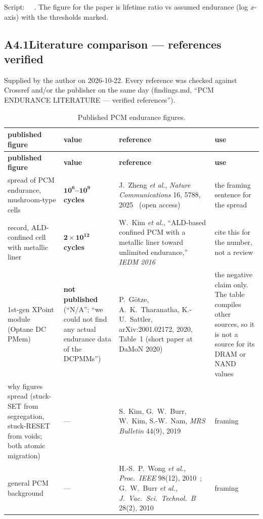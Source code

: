 \documentclass[11pt,a4paper]{article}
\newcommand{\hd}[1]{\textbf{#1}}
\begin{document}
Script: \texttt{ }\texttt{ }. The figure for the paper is
lifetime ratio vs assumed endurance (log $x$-axis) with the thresholds
marked.

\subsection{A4.1\quad Literature comparison --- references verified}
\label{sec:lit}

Supplied by the author on 2026-10-22. Every reference was checked against
Crossref and/or the publisher on the same day (findings.md, ``PCM ENDURANCE
LITERATURE --- verified references'').

\begin{xltabular}{\linewidth}{@{}Y{0.95} Y{0.75} Y{1.3} Y{1.0}@{}}
\caption{Published PCM endurance figures.}\label{tab:lit}\\
\toprule
\hd{published figure} & \hd{value} & \hd{reference} & \hd{use} \\
\midrule
\endfirsthead
\toprule
\hd{published figure} & \hd{value} & \hd{reference} & \hd{use} \\
\midrule
\endhead
\bottomrule
\endlastfoot
spread of PCM endurance, mushroom-type cells & \textbf{$\mathbf{10^{6}}$--$\mathbf{10^{9}}$ cycles}
  & J.~Zheng \emph{et al.}, \emph{Nature Communications} 16, 5788, 2025~\cite{zheng2025natcomm} (open access)
  & the framing sentence for the spread \\
record, ALD-confined cell with metallic liner & \textbf{$\mathbf{2 \times 10^{12}}$ cycles}
  & W.~Kim \emph{et al.}, ``ALD-based confined PCM with a metallic liner toward unlimited endurance,'' \emph{IEDM 2016}~\cite{kim2016iedm}
  & cite this for the number, not a review \\
1st-gen XPoint module (Optane DC PMem) & \textbf{not published} (``N/A''; ``we could not find any actual endurance data of the DCPMMs'')
  & P.~G\"otze, A.~K.~Tharanatha, K.-U.~Sattler, arXiv:2001.02172, 2020, Table~1 (short paper at DaMoN 2020)~\cite{goetze2020pmem}
  & the negative claim only. The table compiles other sources, so it is not a source for its DRAM or NAND values \\
why figures spread (stuck-SET from segregation, stuck-RESET from voids; both atomic migration) & ---
  & S.~Kim, G.~W.~Burr, W.~Kim, S.-W.~Nam, \emph{MRS Bulletin} 44(9), 2019~\cite{kim2019mrs}
  & framing \\
general PCM background & ---
  & H.-S.~P.~Wong \emph{et al.}, \emph{Proc.\ IEEE} 98(12), 2010~\cite{wong2010pcm}; G.~W.~Burr \emph{et al.}, \emph{J.\ Vac.\ Sci.\ Technol.\ B} 28(2), 2010~\cite{burr2010pcm}
  & framing \\
\end{xltabular}
\end{document}
